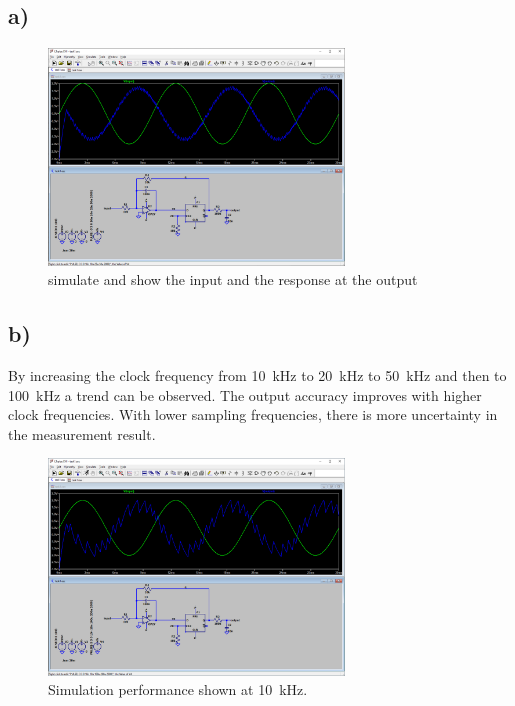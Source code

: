 \documentclass{article}
\begin{document}
	\subsection*{a)}

	\begin{figure}[H]
	    \centering
	    \includegraphics[width=0.7\textwidth]{1a}
	    \caption{simulate and show the input and the response at the output}
	\end{figure}

	\subsection*{b)}

		By increasing the clock frequency from \SI{10}{\kHz} to \SI{20}{\kHz} to \SI{50}{\kHz} and then to \SI{100}{\kHz} a trend can be observed. The output accuracy improves with higher clock frequencies. With lower sampling frequencies, there is more uncertainty in the measurement result.

		\begin{figure}[H]
			\centering
			\includegraphics[width=0.7\textwidth]{1b100u}
			\caption{Simulation performance shown at \SI{10}{\kHz}.}
		\end{figure}
\end{document}
